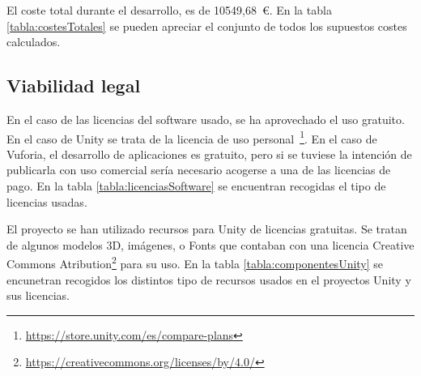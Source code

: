 	El coste total durante el desarrollo, es de 10549,68~\euro. En la tabla \ref{tabla:costesTotales} se pueden apreciar el conjunto de todos los supuestos costes calculados.
	

\subsection{Viabilidad legal}

En el caso de las licencias del software usado, se ha aprovechado el uso gratuito. En el caso de Unity se trata de la licencia de uso personal~\footnote{\url{https://store.unity.com/es/compare-plans}}. En el caso de Vuforia, el desarrollo de aplicaciones es gratuito, pero si se tuviese la intención de publicarla con uso comercial sería necesario acogerse a una de las licencias de pago. En la tabla \ref{tabla:licenciasSoftware} se encuentran recogidas el tipo de licencias usadas.

El proyecto se han utilizado recursos para Unity de licencias gratuitas. Se tratan de algunos modelos 3D, imágenes, o Fonts que contaban con una licencia Creative Commons Atribution\footnote{\url{https://creativecommons.org/licenses/by/4.0/}} para su uso. En la tabla \ref{tabla:componentesUnity} se encunetran recogidos los distintos tipo de recursos usados en el proyectos Unity y sus licencias.


